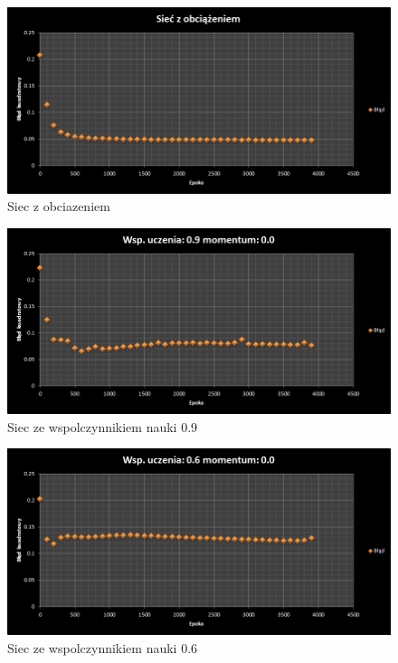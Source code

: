 \documentclass{classrep}
\begin{document}
\begin{figure}[ht]
\centering
			\includegraphics[scale=0.65]{pictures/test02.png}
	\caption{Siec z obciazeniem}
	\label{fig:Siec z obciazeniem}
\end{figure}

\begin{figure}[ht]
\centering
			\includegraphics[scale=0.65]{pictures/test03.png}
	\caption{Siec ze wspolczynnikiem nauki 0.9}
	\label{fig:Siec ze wspolczynnikiem nauki 0.9}
\end{figure}

\begin{figure}[ht]
\centering
			\includegraphics[scale=0.65]{pictures/test04.png}
	\caption{Siec ze wspolczynnikiem nauki 0.6}
	\label{fig:Siec ze wspolczynnikiem nauki 0.6}
\end{figure}
\end{document}
